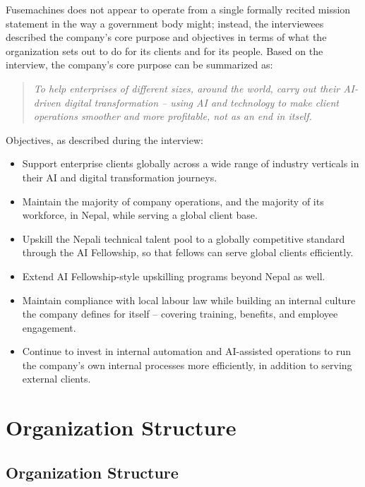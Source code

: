 \documentclass[12pt,a4paper]{report}
\begin{document}
Fusemachines does not appear to operate from a single formally recited mission statement in the way a government body might; instead, the interviewees described the company's core purpose and objectives in terms of what the organization sets out to do for its clients and for its people. Based on the interview, the company's core purpose can be summarized as:

\begin{quote}
\itshape To help enterprises of different sizes, around the world, carry out their AI-driven digital transformation -- using AI and technology to make client operations smoother and more profitable, not as an end in itself.
\end{quote}

Objectives, as described during the interview:
\begin{itemize}[leftmargin=1.5cm]
  \item Support enterprise clients globally across a wide range of industry verticals in their AI and digital transformation journeys.
  \item Maintain the majority of company operations, and the majority of its workforce, in Nepal, while serving a global client base.
  \item Upskill the Nepali technical talent pool to a globally competitive standard through the AI Fellowship, so that fellows can serve global clients efficiently.
  \item Extend AI Fellowship-style upskilling programs beyond Nepal as well.
  \item Maintain compliance with local labour law while building an internal culture the company defines for itself -- covering training, benefits, and employee engagement.
  \item Continue to invest in internal automation and AI-assisted operations to run the company's own internal processes more efficiently, in addition to serving external clients.
\end{itemize}

\chapter{Organization Structure}

\section{Organization Structure}
\end{document}
